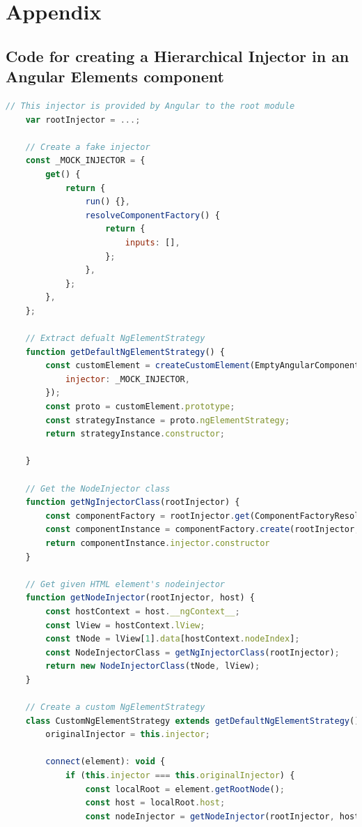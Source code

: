 \appendix
\chapter*{Appendix}

\section{Code for creating a Hierarchical Injector in an Angular Elements component}

\begin{lstlisting}[language={JavaScript},caption={The code for creating a Hierarchical Injector in an Angular Elements component},label={lst:appendix:hierarchical-injectors}]
	// This injector is provided by Angular to the root module
	var rootInjector = ...;
	
	// Create a fake injector
	const _MOCK_INJECTOR = {
		get() {
			return {
				run() {},
				resolveComponentFactory() {
					return {
						inputs: [],
					};
				},
			};
		},
	};
	
	// Extract defualt NgElementStrategy
	function getDefaultNgElementStrategy() {
		const customElement = createCustomElement(EmptyAngularComponent, {
			injector: _MOCK_INJECTOR,
		});
		const proto = customElement.prototype;
		const strategyInstance = proto.ngElementStrategy;
		return strategyInstance.constructor;
	
	}
	
	// Get the NodeInjector class
	function getNgInjectorClass(rootInjector) {
		const componentFactory = rootInjector.get(ComponentFactoryResolver).resolveComponentFactory(EmptyAngularComponent);
		const componentInstance = componentFactory.create(rootInjector, []);
		return componentInstance.injector.constructor
	}
	
	// Get given HTML element's nodeinjector
	function getNodeInjector(rootInjector, host) {
		const hostContext = host.__ngContext__;
		const lView = hostContext.lView;
		const tNode = lView[1].data[hostContext.nodeIndex];
		const NodeInjectorClass = getNgInjectorClass(rootInjector);
		return new NodeInjectorClass(tNode, lView);
	}
	
	// Create a custom NgElementStrategy
	class CustomNgElementStrategy extends getDefaultNgElementStrategy() {
		originalInjector = this.injector;
	
		connect(element): void {
			if (this.injector === this.originalInjector) {
				const localRoot = element.getRootNode();
				const host = localRoot.host;
				const nodeInjector = getNodeInjector(rootInjector, host);
	

\end{lstlisting}

